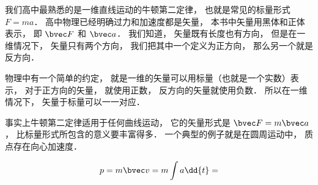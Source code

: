 
我们高中最熟悉的是一维直线运动的牛顿第二定律， 也就是常见的标量形式 $F = ma$． 高中物理已经明确过力和加速度都是矢量， 本书中矢量用黑体和正体表示， 即 $\bvec F$ 和 $\bvec a$． 我们知道， 矢量既有长度也有方向， 但是在一维情况下， 矢量只有两个方向， 我们把其中一个定义为正方向， 那么另一个就是反方向． 

物理中有一个简单的约定， 就是一维的矢量可以用标量（也就是一个实数）表示， 对于正方向的矢量， 就使用正数， 反方向的矢量就使用负数． 所以在一维情况下， 矢量于标量可以一一对应．

事实上牛顿第二定律适用于任何曲线运动， 它的矢量形式是 $\bvec F = m\bvec a$， 比标量形式所包含的意义要丰富得多． 一个典型的例子就是在圆周运动中， 质点存在向心加速度．


\begin{equation}
p = m\bvec v = m\int a \dd{t} = 
\end{equation}

